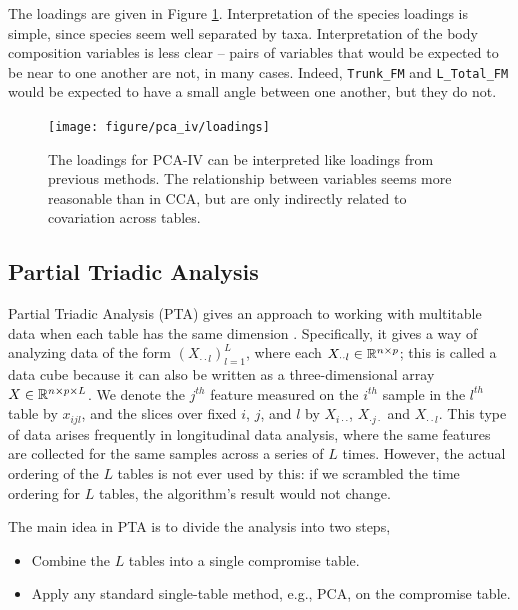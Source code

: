 \documentclass{article}
\begin{document}
The loadings are given in Figure \ref{fig:pca_iv_loadings}. Interpretation of
the species loadings is simple, since species seem well separated by taxa.
Interpretation of the body composition variables is less clear -- pairs of
variables that would be expected to be near to one another are not, in many
cases. Indeed, \texttt{Trunk\_FM} and \texttt{L\_Total\_FM} would be expected to
have a small angle between one another, but they do not.

\begin{figure}[ht]
  \centering
  \texttt{[image: figure/pca\_iv/loadings]}
  \caption{The loadings for PCA-IV can be interpreted like loadings from
    previous methods. The relationship between variables seems more reasonable
    than in CCA, but are only indirectly related to covariation across
    tables. \label{fig:pca_iv_loadings} }
\end{figure}

\subsection{Partial Triadic Analysis}
\label{subsec:partial_triadic_analysis}

Partial Triadic Analysis (PTA) gives an approach to working with multitable data
when each table has the same dimension \citep{thioulouse2011simultaneous}.
Specifically, it gives a way of analyzing data of the form $\left(X_{\cdot\cdot
  l}\right)_{l = 1}^{L}$, where each $X_{\cdot\cdot l} \in \mathbb{R}^{n \times p}$;
this is called a data cube because it can also be written as a three-dimensional
array $X \in \mathbb{R}^{n \times p \times L}$. We denote the $j^{th}$ feature
measured on the $i^{th}$ sample in the $l^{th}$ table by $x_{ijl}$, and the
slices over fixed $i$, $j$, and $l$ by $X_{i \cdot \cdot}$, $X_{\cdot j \cdot}$
and $X_{\cdot \cdot l}$. This type of data arises frequently in longitudinal
data analysis, where the same features are collected for the same samples across
a series of $L$ times. However, the actual ordering of the $L$ tables is not
ever used by this: if we scrambled the time ordering for $L$ tables, the
algorithm's result would not change.

The main idea in PTA is to divide the analysis into two steps,
\begin{itemize}
  \item Combine the $L$ tables into a single compromise table.
  \item Apply any standard single-table method, e.g., PCA, on the
    compromise table.
\end{itemize}
\end{document}
